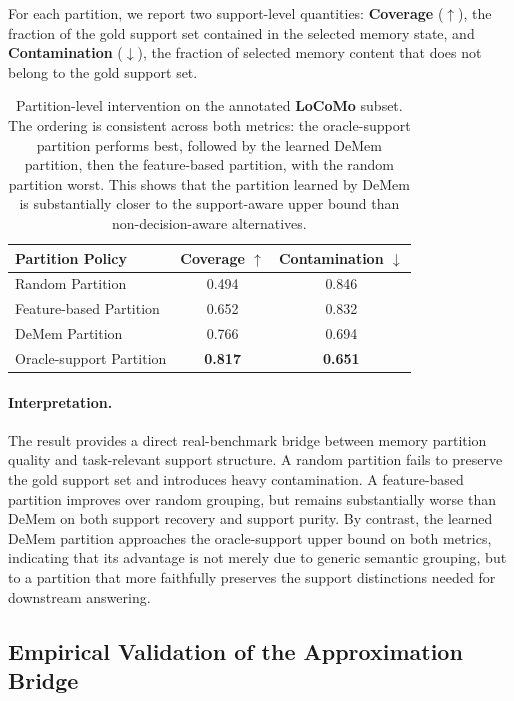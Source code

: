 \documentclass{article}
\theoremstyle{plain}
\theoremstyle{definition}
\theoremstyle{remark}
\begin{document}
For each partition, we report two support-level quantities:
\textbf{Coverage} ($\uparrow$), the fraction of the gold support set contained in the selected memory state,
and \textbf{Contamination} ($\downarrow$), the fraction of selected memory content that does not belong to the gold support set.

\begin{table}[t]
\centering
\small
\begin{tabular}{lcc}
\toprule
Partition Policy & Coverage $\uparrow$ & Contamination $\downarrow$ \\
\midrule
Random Partition & 0.494 & 0.846 \\
Feature-based Partition & 0.652 & 0.832 \\
DeMem Partition & 0.766 & 0.694 \\
Oracle-support Partition & \textbf{0.817} & \textbf{0.651} \\
\bottomrule
\end{tabular}
\caption{Partition-level intervention on the annotated \textbf{LoCoMo} subset.
The ordering is consistent across both metrics: the oracle-support partition performs best, followed by the learned DeMem partition, then the feature-based partition, with the random partition worst.
This shows that the partition learned by DeMem is substantially closer to the support-aware upper bound than non-decision-aware alternatives.}
\label{tab:partition-intervention}
\end{table}

\paragraph{Interpretation.}
The result provides a direct real-benchmark bridge between memory partition quality and task-relevant support structure.
A random partition fails to preserve the gold support set and introduces heavy contamination.
A feature-based partition improves over random grouping, but remains substantially worse than DeMem on both support recovery and support purity.
By contrast, the learned DeMem partition approaches the oracle-support upper bound on both metrics, indicating that its advantage is not merely due to generic semantic grouping, but to a partition that more faithfully preserves the support distinctions needed for downstream answering.

\subsection{Empirical Validation of the Approximation Bridge}
\label{app:bridge-empirical}
\end{document}
